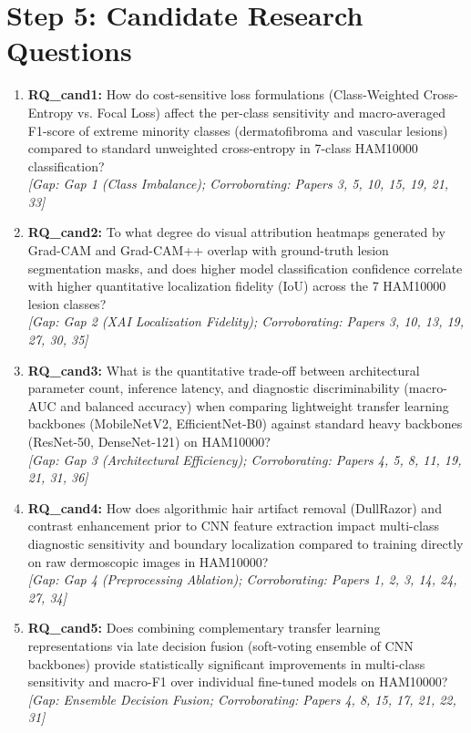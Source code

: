 \documentclass[11pt,a4paper]{article}
\begin{document}
\section{Step 5: Candidate Research Questions}
\begin{enumerate}
\item \textbf{RQ\_cand1:} How do cost-sensitive loss formulations (Class-Weighted Cross-Entropy vs. Focal Loss) affect the per-class sensitivity and macro-averaged F1-score of extreme minority classes (dermatofibroma and vascular lesions) compared to standard unweighted cross-entropy in 7-class HAM10000 classification? \\
\textit{[Gap: Gap 1 (Class Imbalance); Corroborating: Papers 3, 5, 10, 15, 19, 21, 33]}
\item \textbf{RQ\_cand2:} To what degree do visual attribution heatmaps generated by Grad-CAM and Grad-CAM++ overlap with ground-truth lesion segmentation masks, and does higher model classification confidence correlate with higher quantitative localization fidelity (IoU) across the 7 HAM10000 lesion classes? \\
\textit{[Gap: Gap 2 (XAI Localization Fidelity); Corroborating: Papers 3, 10, 13, 19, 27, 30, 35]}
\item \textbf{RQ\_cand3:} What is the quantitative trade-off between architectural parameter count, inference latency, and diagnostic discriminability (macro-AUC and balanced accuracy) when comparing lightweight transfer learning backbones (MobileNetV2, EfficientNet-B0) against standard heavy backbones (ResNet-50, DenseNet-121) on HAM10000? \\
\textit{[Gap: Gap 3 (Architectural Efficiency); Corroborating: Papers 4, 5, 8, 11, 19, 21, 31, 36]}
\item \textbf{RQ\_cand4:} How does algorithmic hair artifact removal (DullRazor) and contrast enhancement prior to CNN feature extraction impact multi-class diagnostic sensitivity and boundary localization compared to training directly on raw dermoscopic images in HAM10000? \\
\textit{[Gap: Gap 4 (Preprocessing Ablation); Corroborating: Papers 1, 2, 3, 14, 24, 27, 34]}
\item \textbf{RQ\_cand5:} Does combining complementary transfer learning representations via late decision fusion (soft-voting ensemble of CNN backbones) provide statistically significant improvements in multi-class sensitivity and macro-F1 over individual fine-tuned models on HAM10000? \\
\textit{[Gap: Ensemble Decision Fusion; Corroborating: Papers 4, 8, 15, 17, 21, 22, 31]}

\end{enumerate}
\end{document}
